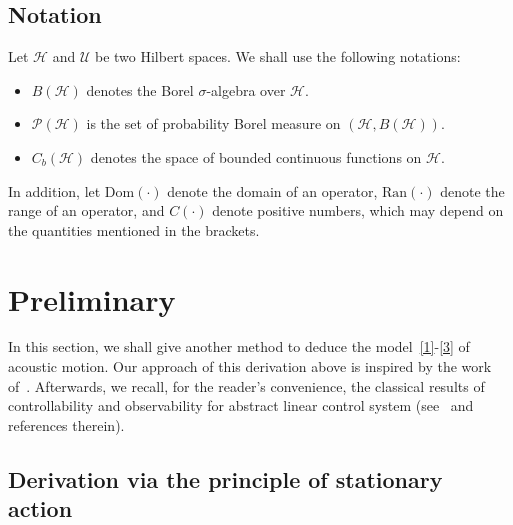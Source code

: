 \documentclass[10pt]{elsarticle}
\begin{document}
\subsection*{Notation}  

Let $\mathcal{H}$ and $\mathcal{U}$ be two Hilbert spaces. 
We shall use the following notations: 
\begin{itemize}
\item $B(\mathcal{H})$ denotes the Borel $\sigma$-algebra over $\mathcal{H}$. 
\item $\mathcal{P}(\mathcal{H})$ is the set of probability Borel measure on $(\mathcal{H}, B(\mathcal{H}))$. 
\item $C_b(\mathcal{H})$ denotes the space of bounded continuous functions on $\mathcal{H}$. 
\end{itemize}
In addition, let $\mathrm{Dom}(\cdot)$ denote the domain of an operator, $\mathrm{Ran}(\cdot)$ denote the range of an operator, and $C(\cdot)$ denote positive numbers, which may depend on the quantities mentioned in the brackets.

\section{Preliminary}
\label{sec:preliminary} 

In this section, we shall give another method to deduce the model~\eqref{1}-\eqref{3} of acoustic motion. Our approach of this derivation above is inspired by the work of~\cite{goldstein2006}. Afterwards, we recall, for the reader's convenience, the classical results of controllability and observability for abstract linear control system (see~\cite[Chapter 2.3-2.4, pp. 51-61]{Coron} and references therein).

\subsection{Derivation via the principle of stationary action}
\label{subsec:derivation}
\end{document}
